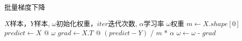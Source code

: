 \documentclass[11pt]{article}
\begin{document}
\begin{CJK*}{UTF8}{gkai}
    \begin{algorithm}
        \caption{批量梯度下降}
        \begin{algorithmic}[1] %
            \Require $X$样本，$Y$样本, $\omega$初始化权重，$iter$迭代次数, $\alpha$学习率
            \Ensure $\omega$权重
                \State $m \gets X.shape[0]$ 
                	\State $predict \gets X$ @ $\omega$
                	\State $grad \gets X.T$ @ $(predict - Y)$ / $m$ * $\alpha$
					\State $\omega \gets \omega$ - $grad$
                \EndFor
                \State \Return{$\omega$}
            \EndFunction
        \end{algorithmic}
    \end{algorithm}
\end{CJK*}
\end{document}
